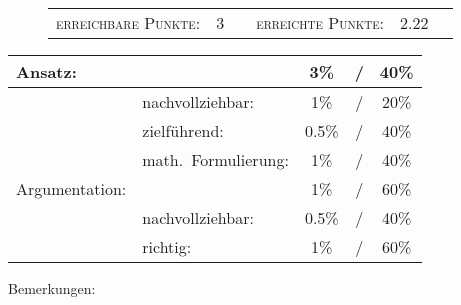 \documentclass{article}
\begin{document}
\vspace{-0.5cm}
\begin{figure}[h!]
\begin{tabular}{crcrcr}
\textsc{erreichbare Punkte:} &3& & \textsc{erreichte Punkte:} &2.22
\end{tabular}
\end{figure}
\vspace{-0.1cm}
\begin{minipage}[t]{0.6\textwidth}
\flushleft
\begin{tabular}{l|lccc}
Ansatz:& &3\%&/&40\%\\\hline
&nachvollziehbar:&1\%&/&20\%\\
&zielf{\"u}hrend:&0.5\%&/&40\%\\
&math.~Formulierung:& 1\%&/&40\%\\\hline\hline
Argumentation:& &1\%&/&60\%\\\hline
&nachvollziehbar:&0.5\%&/&40\%\\
&richtig:&1\%&/&60\%\\\hline
\end{tabular}
\end{minipage}
\hfill
\begin{minipage}[t]{0.4\textwidth}
	\vspace{-1.75cm}
	Bemerkungen:\\\vspace*{0.2cm}
	\underline{\hspace{0.75\textwidth}}\\\vspace*{0.2cm}
	\underline{\hspace{0.75\textwidth}}
	\\\vspace*{0.2cm}
	\underline{\hspace{0.75\textwidth}}
	\\\vspace*{0.2cm}
	\underline{\hspace{0.75\textwidth}}
	\\\vspace*{0.2cm}
	\underline{\hspace{0.75\textwidth}}
\end{minipage}
	\vspace{0.5cm}\clearpage
\end{document}
